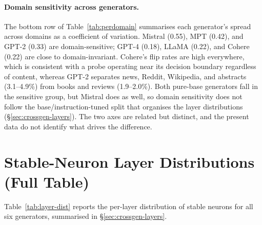 \documentclass[11pt]{article}
\begin{document}
\paragraph{Domain sensitivity across generators.}
The bottom row of Table~\ref{tab:perdomain} summarises each generator's spread
across domains as a coefficient of variation. Mistral (0.55), MPT (0.42), and
GPT-2 (0.33) are domain-sensitive; GPT-4 (0.18), LLaMA (0.22), and Cohere
(0.22) are close to domain-invariant. Cohere's flip rates are high everywhere,
which is consistent with a probe operating near its decision boundary
regardless of content, whereas GPT-2 separates news, Reddit, Wikipedia, and
abstracts (3.1--4.9\%) from books and reviews (1.9--2.0\%). Both pure-base
generators fall in the sensitive group, but Mistral does as well, so domain
sensitivity does not follow the base/instruction-tuned split that organises the
layer distributions (§\ref{sec:crossgen-layers}). The two axes are related but
distinct, and the present data do not identify what drives the difference.

\section{Stable-Neuron Layer Distributions (Full Table)}
\label{app:layer-dist}

Table~\ref{tab:layer-dist} reports the per-layer distribution of stable neurons for all six generators, summarised in §\ref{sec:crossgen-layers}.

\begin{table}[!htbp]
\centering
{}
\caption{Stable-neuron counts by layer group across six generators. Bold indicates the peak layer group for each generator. Instruction-tuned generators (GPT-4, Mistral, LLaMA, Cohere) concentrate 30--36\% of stable neurons in layer~12; both pure-base generators (GPT-2, MPT) have $\leq$14\% in layer~12.}
\label{tab:layer-dist}
\end{table}
\end{document}
